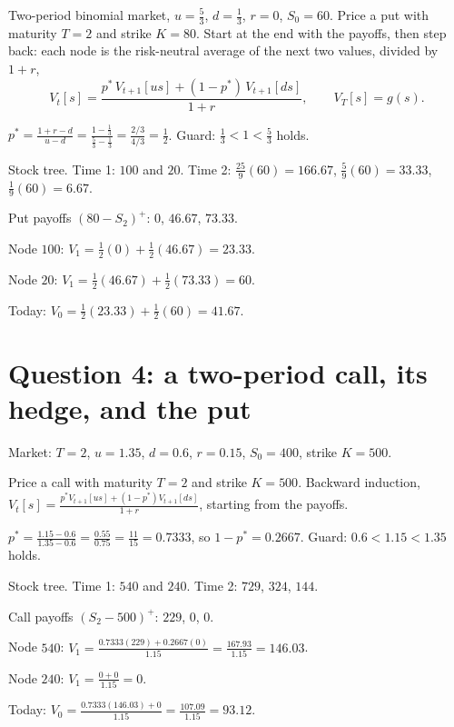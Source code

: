 \begin{problem}[Q3(b)]
Two-period binomial market, $u=\frac53$, $d=\frac13$, $r=0$, $S_0=60$. Price a put with maturity $T=2$ and strike $K=80$.
\cardsays Start at the end with the payoffs, then step back: each node is the risk-neutral average of the next two values, divided by $1+r$,
\[
V_t[s]=\frac{p^*\,V_{t+1}[us]+(1-p^*)\,V_{t+1}[ds]}{1+r},\qquad V_T[s]=g(s).
\]
\working
\begin{steps}
\item $p^*=\frac{1+r-d}{u-d}=\frac{1-\frac13}{\frac53-\frac13}=\frac{2/3}{4/3}=\frac12$. Guard: $\frac13<1<\frac53$ holds.
\item Stock tree. Time 1: $100$ and $20$. Time 2: $\frac{25}9(60)=166.67$, $\frac59(60)=33.33$, $\frac19(60)=6.67$.
\item Put payoffs $(80-S_2)^+$: $0$, $46.67$, $73.33$.
\item Node $100$: $V_1=\frac12(0)+\frac12(46.67)=23.33$.
\item Node $20$: $V_1=\frac12(46.67)+\frac12(73.33)=60$.
\item Today: $V_0=\frac12(23.33)+\frac12(60)=41.67$.
\end{steps}
\end{problem}

\section{Question 4: a two-period call, its hedge, and the put}

Market: $T=2$, $u=1.35$, $d=0.6$, $r=0.15$, $S_0=400$, strike $K=500$.

\begin{problem}[Q4(i)]
Price a call with maturity $T=2$ and strike $K=500$.
\cardsays Backward induction, $V_t[s]=\frac{p^*V_{t+1}[us]+(1-p^*)V_{t+1}[ds]}{1+r}$, starting from the payoffs.
\working
\begin{steps}
\item $p^*=\frac{1.15-0.6}{1.35-0.6}=\frac{0.55}{0.75}=\frac{11}{15}=0.7333$, so $1-p^*=0.2667$. Guard: $0.6<1.15<1.35$ holds.
\item Stock tree. Time 1: $540$ and $240$. Time 2: $729$, $324$, $144$.
\item Call payoffs $(S_2-500)^+$: $229$, $0$, $0$.
\item Node $540$: $V_1=\frac{0.7333(229)+0.2667(0)}{1.15}=\frac{167.93}{1.15}=146.03$.
\item Node $240$: $V_1=\frac{0+0}{1.15}=0$.
\item Today: $V_0=\frac{0.7333(146.03)+0}{1.15}=\frac{107.09}{1.15}=93.12$.
\end{steps}
\end{problem}

